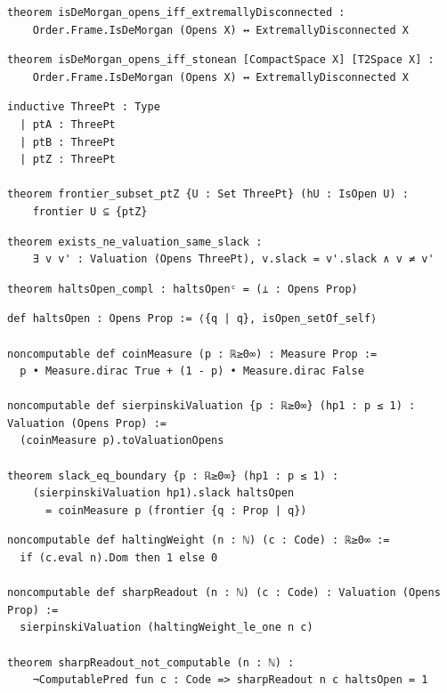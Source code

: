 \label{lean:isdemorgan-opens-iff-extremallydisconnected}
\begin{lstlisting}
theorem isDeMorgan_opens_iff_extremallyDisconnected :
    Order.Frame.IsDeMorgan (Opens X) ↔ ExtremallyDisconnected X
\end{lstlisting}

\label{lean:isdemorgan-opens-iff-stonean}
\begin{lstlisting}
theorem isDeMorgan_opens_iff_stonean [CompactSpace X] [T2Space X] :
    Order.Frame.IsDeMorgan (Opens X) ↔ ExtremallyDisconnected X
\end{lstlisting}

\label{lean:frontier-subset-ptz}
\begin{lstlisting}
inductive ThreePt : Type
  | ptA : ThreePt
  | ptB : ThreePt
  | ptZ : ThreePt

theorem frontier_subset_ptZ {U : Set ThreePt} (hU : IsOpen U) :
    frontier U ⊆ {ptZ}
\end{lstlisting}

\label{lean:exists-ne-valuation-same-slack}
\begin{lstlisting}
theorem exists_ne_valuation_same_slack :
    ∃ v v' : Valuation (Opens ThreePt), v.slack = v'.slack ∧ v ≠ v'
\end{lstlisting}

\label{lean:haltsopen-compl}
\begin{lstlisting}
theorem haltsOpen_compl : haltsOpenᶜ = (⊥ : Opens Prop)
\end{lstlisting}

\label{lean:slack-eq-boundary}
\begin{lstlisting}
def haltsOpen : Opens Prop := ⟨{q | q}, isOpen_setOf_self⟩

noncomputable def coinMeasure (p : ℝ≥0∞) : Measure Prop :=
  p • Measure.dirac True + (1 - p) • Measure.dirac False

noncomputable def sierpinskiValuation {p : ℝ≥0∞} (hp1 : p ≤ 1) : Valuation (Opens Prop) :=
  (coinMeasure p).toValuationOpens

theorem slack_eq_boundary {p : ℝ≥0∞} (hp1 : p ≤ 1) :
    (sierpinskiValuation hp1).slack haltsOpen
      = coinMeasure p (frontier {q : Prop | q})
\end{lstlisting}

\label{lean:sharpreadout-not-computable}
\begin{lstlisting}
noncomputable def haltingWeight (n : ℕ) (c : Code) : ℝ≥0∞ :=
  if (c.eval n).Dom then 1 else 0

noncomputable def sharpReadout (n : ℕ) (c : Code) : Valuation (Opens Prop) :=
  sierpinskiValuation (haltingWeight_le_one n c)

theorem sharpReadout_not_computable (n : ℕ) :
    ¬ComputablePred fun c : Code => sharpReadout n c haltsOpen = 1
\end{lstlisting}

